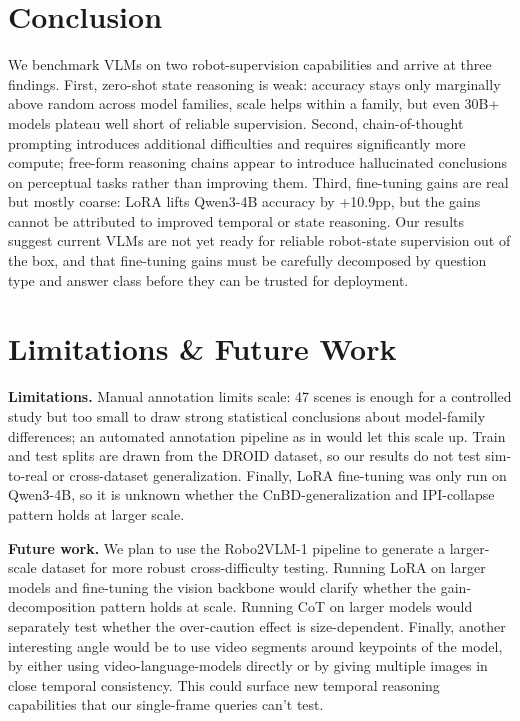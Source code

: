\section{Conclusion}
\label{sec:conclusion}

We benchmark VLMs on two robot-supervision capabilities and arrive at three findings.
First, zero-shot state reasoning is weak: accuracy stays only marginally above random across model families, scale helps within a family, but even 30B+ models
plateau well short of reliable supervision. Second, chain-of-thought prompting introduces additional difficulties and requires significantly more compute; free-form reasoning chains appear to introduce hallucinated conclusions on perceptual tasks rather than improving them. Third, fine-tuning gains are real but mostly coarse: LoRA lifts Qwen3-4B accuracy by +10.9pp, but the gains cannot be attributed to improved temporal or state reasoning. Our
results suggest current VLMs are not yet ready for reliable robot-state supervision out of the box, and that fine-tuning gains must be carefully decomposed by question type and answer class before they can be trusted for deployment.

\section{Limitations \& Future Work}
\label{sec:limitations}

\textbf{Limitations.} Manual annotation limits scale: 47 scenes is enough for a
controlled study but too small to draw strong statistical conclusions about
model-family differences; an automated annotation pipeline as in \cite{chen2025robo2vlm} would let this scale up. Train and test splits are drawn from the DROID dataset, so our results do not test sim-to-real or cross-dataset generalization. Finally, LoRA fine-tuning was only run on Qwen3-4B, so it is unknown whether the CnBD-generalization and IPI-collapse pattern holds
at larger scale.

\textbf{Future work.} We plan to use the Robo2VLM-1 pipeline to generate a larger-scale dataset for more robust cross-difficulty testing. Running LoRA on larger models and fine-tuning the vision backbone would clarify whether the gain-decomposition pattern holds at scale. Running CoT on larger models would separately test whether the over-caution effect is size-dependent. Finally, another interesting angle would be to use video segments around keypoints of the model, by either using video-language-models directly or by giving multiple images in close temporal consistency. This could surface new temporal reasoning capabilities that our single-frame queries can't test.

